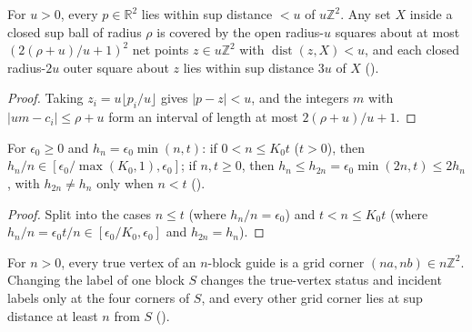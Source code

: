 \begin{lemma}
    \label{lem:peps_dyadic_nets}
    \leanok
    For $u>0$, every $p\in\mathbb R^2$ lies within sup distance $<u$ of
    $u\mathbb Z^2$. Any set $X$ inside a closed sup ball of radius $\rho$ is
    covered by the open radius-$u$ squares about at most $(2(\rho+u)/u+1)^2$ net
    points $z\in u\mathbb Z^2$ with $\operatorname{dist}(z,X)<u$, and each closed
    radius-$2u$ outer square about $z$ lies within sup distance $3u$ of $X$
    (\cite[Section~7, lines 491--499, 520--525]{OpenAI2026PolynomialPEPS}).
\end{lemma}

\begin{proof}\leanok
    Taking $z_i=u\lfloor p_i/u\rfloor$ gives $|p-z|<u$, and the integers $m$ with
    $|um-c_i|\le\rho+u$ form an interval of length at most $2(\rho+u)/u+1$.
\end{proof}

\begin{lemma}
    \label{lem:peps_dyadic_small_radius}
    \leanok
    For $\epsilon_0\ge0$ and $h_n=\epsilon_0\min(n,t)$: if $0<n\le K_0t$ ($t>0$),
    then $h_n/n\in[\epsilon_0/\max(K_0,1),\epsilon_0]$; if $n,t\ge0$, then
    $h_n\le h_{2n}=\epsilon_0\min(2n,t)\le2h_n$, with $h_{2n}\ne h_n$ only when
    $n<t$ (\cite[Section~7, lines 511--516, 529--533]{OpenAI2026PolynomialPEPS}).
\end{lemma}

\begin{proof}\leanok
    Split into the cases $n\le t$ (where $h_n/n=\epsilon_0$) and $t<n\le K_0t$
    (where $h_n/n=\epsilon_0t/n\in[\epsilon_0/K_0,\epsilon_0]$ and $h_{2n}=h_n$).
\end{proof}

\begin{lemma}
    \label{lem:peps_dyadic_direct_repainting}
    \leanok
    For $n>0$, every true vertex of an $n$-block guide is a grid corner
    $(na,nb)\in n\mathbb Z^2$. Changing the label of one block $S$ changes the
    true-vertex status and incident labels only at the four corners of $S$, and
    every other grid corner lies at sup distance at least $n$ from $S$
    (\cite[Section~7, lines 507--527]{OpenAI2026PolynomialPEPS}).
\end{lemma}

